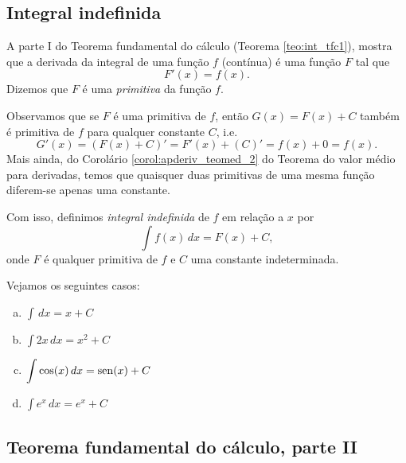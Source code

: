 \subsection{Integral indefinida}

A parte I do Teorema fundamental do cálculo (Teorema \ref{teo:int_tfc1}), mostra que a derivada da integral de uma função $f$ (contínua) é uma função $F$ tal que
\begin{equation}
  F'(x) = f(x).
\end{equation}
Dizemos que $F$ é uma \emph{primitiva} da função $f$.

Observamos que se $F$ é uma primitiva de $f$, então $G(x) = F(x) + C$ também é primitiva de $f$ para qualquer constante $C$, i.e.
\begin{equation}
  G'(x) = (F(x) + C)' = F'(x) + (C)' = f(x) + 0 = f(x).
\end{equation}
Mais ainda, do Corolário \ref{corol:apderiv_teomed_2} do Teorema do valor médio para derivadas, temos que quaisquer duas primitivas de uma mesma função diferem-se apenas uma constante.

Com isso, definimos \emph{integral indefinida} de $f$ em relação a $x$ por
\begin{equation}
  \int f(x)\,dx = F(x) + C,
\end{equation}
onde $F$ é qualquer primitiva de $f$ e $C$ uma constante indeterminada.

\begin{ex}
  Vejamos os seguintes casos:
  \begin{enumerate}[a)]
  \item $\displaystyle \int \,dx = x + C$
  \item $\displaystyle \int 2x\,dx = x^2 + C$
  \item $\displaystyle \int \cos(x)\,dx = \operatorname{sen}(x) + C$
  \item $\displaystyle \int e^x\,dx = e^x + C$
  \end{enumerate}
\end{ex}

\subsection{Teorema fundamental do cálculo, parte II}

